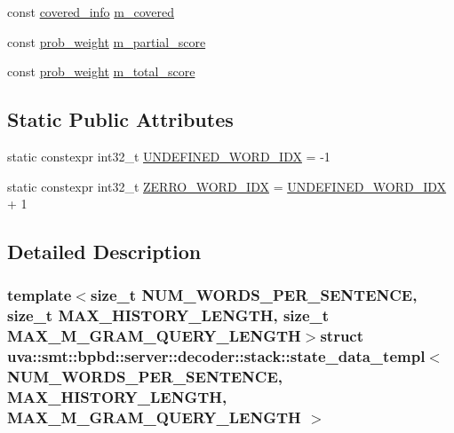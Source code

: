 \begin{DoxyCompactItemize}
\item 
const \hyperlink{structuva_1_1smt_1_1bpbd_1_1server_1_1decoder_1_1stack_1_1state__data__templ_a1fca0516a4ceb05fe35ea64a0b354d8a}{covered\+\_\+info} \hyperlink{structuva_1_1smt_1_1bpbd_1_1server_1_1decoder_1_1stack_1_1state__data__templ_a5483ddf5862e4c020020b49f889a53c8}{m\+\_\+covered}
\item 
const \hyperlink{namespaceuva_1_1smt_1_1bpbd_1_1server_a01e9ea4de9c226f4464862e84ff0bbcc}{prob\+\_\+weight} \hyperlink{structuva_1_1smt_1_1bpbd_1_1server_1_1decoder_1_1stack_1_1state__data__templ_a59d43cf154a57042465c0c5645a1ef03}{m\+\_\+partial\+\_\+score}
\item 
const \hyperlink{namespaceuva_1_1smt_1_1bpbd_1_1server_a01e9ea4de9c226f4464862e84ff0bbcc}{prob\+\_\+weight} \hyperlink{structuva_1_1smt_1_1bpbd_1_1server_1_1decoder_1_1stack_1_1state__data__templ_a52cf11765c3e212d734f66d0da9af1a2}{m\+\_\+total\+\_\+score}
\end{DoxyCompactItemize}
\subsection*{Static Public Attributes}
\begin{DoxyCompactItemize}
\item 
static constexpr int32\+\_\+t \hyperlink{structuva_1_1smt_1_1bpbd_1_1server_1_1decoder_1_1stack_1_1state__data__templ_ad6a5d72a6d836d5f9db1ea53c1067bad}{U\+N\+D\+E\+F\+I\+N\+E\+D\+\_\+\+W\+O\+R\+D\+\_\+\+I\+D\+X} = -\/1
\item 
static constexpr int32\+\_\+t \hyperlink{structuva_1_1smt_1_1bpbd_1_1server_1_1decoder_1_1stack_1_1state__data__templ_ac5e9bfa508a553d91bb81e179cb869b1}{Z\+E\+R\+R\+O\+\_\+\+W\+O\+R\+D\+\_\+\+I\+D\+X} = \hyperlink{structuva_1_1smt_1_1bpbd_1_1server_1_1decoder_1_1stack_1_1state__data__templ_ad6a5d72a6d836d5f9db1ea53c1067bad}{U\+N\+D\+E\+F\+I\+N\+E\+D\+\_\+\+W\+O\+R\+D\+\_\+\+I\+D\+X} + 1
\end{DoxyCompactItemize}


\subsection{Detailed Description}
\subsubsection*{template$<$size\+\_\+t N\+U\+M\+\_\+\+W\+O\+R\+D\+S\+\_\+\+P\+E\+R\+\_\+\+S\+E\+N\+T\+E\+N\+C\+E, size\+\_\+t M\+A\+X\+\_\+\+H\+I\+S\+T\+O\+R\+Y\+\_\+\+L\+E\+N\+G\+T\+H, size\+\_\+t M\+A\+X\+\_\+\+M\+\_\+\+G\+R\+A\+M\+\_\+\+Q\+U\+E\+R\+Y\+\_\+\+L\+E\+N\+G\+T\+H$>$struct uva\+::smt\+::bpbd\+::server\+::decoder\+::stack\+::state\+\_\+data\+\_\+templ$<$ N\+U\+M\+\_\+\+W\+O\+R\+D\+S\+\_\+\+P\+E\+R\+\_\+\+S\+E\+N\+T\+E\+N\+C\+E, M\+A\+X\+\_\+\+H\+I\+S\+T\+O\+R\+Y\+\_\+\+L\+E\+N\+G\+T\+H, M\+A\+X\+\_\+\+M\+\_\+\+G\+R\+A\+M\+\_\+\+Q\+U\+E\+R\+Y\+\_\+\+L\+E\+N\+G\+T\+H $>$}

